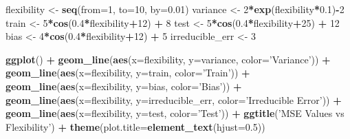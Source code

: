 \documentclass[]{article}
\newenvironment{Shaded}{\begin{snugshade}}{\end{snugshade}}
\newcommand{\DataTypeTok}[1]{\textcolor[rgb]{0.13,0.29,0.53}{#1}}
\newcommand{\DecValTok}[1]{\textcolor[rgb]{0.00,0.00,0.81}{#1}}
\newcommand{\FloatTok}[1]{\textcolor[rgb]{0.00,0.00,0.81}{#1}}
\newcommand{\KeywordTok}[1]{\textcolor[rgb]{0.13,0.29,0.53}{\textbf{#1}}}
\newcommand{\NormalTok}[1]{#1}
\newcommand{\OperatorTok}[1]{\textcolor[rgb]{0.81,0.36,0.00}{\textbf{#1}}}
\newcommand{\StringTok}[1]{\textcolor[rgb]{0.31,0.60,0.02}{#1}}
\begin{document}
\begin{Shaded}
\begin{Highlighting}[]
\NormalTok{flexibility <-}\StringTok{ }\KeywordTok{seq}\NormalTok{(}\DataTypeTok{from=}\DecValTok{1}\NormalTok{, }\DataTypeTok{to=}\DecValTok{10}\NormalTok{, }\DataTypeTok{by=}\FloatTok{0.01}\NormalTok{)}
\NormalTok{variance <-}\StringTok{ }\DecValTok{2}\OperatorTok{*}\KeywordTok{exp}\NormalTok{(flexibility}\OperatorTok{*}\FloatTok{0.1}\NormalTok{)}\OperatorTok{-}\DecValTok{2}
\NormalTok{train <-}\StringTok{ }\DecValTok{5}\OperatorTok{*}\KeywordTok{cos}\NormalTok{(}\FloatTok{0.4}\OperatorTok{*}\NormalTok{flexibility}\OperatorTok{+}\DecValTok{12}\NormalTok{) }\OperatorTok{+}\StringTok{ }\DecValTok{8}
\NormalTok{test <-}\StringTok{ }\DecValTok{5}\OperatorTok{*}\KeywordTok{cos}\NormalTok{(}\FloatTok{0.4}\OperatorTok{*}\NormalTok{flexibility}\OperatorTok{+}\DecValTok{25}\NormalTok{) }\OperatorTok{+}\StringTok{ }\DecValTok{12}
\NormalTok{bias <-}\StringTok{ }\DecValTok{4}\OperatorTok{*}\KeywordTok{cos}\NormalTok{(}\FloatTok{0.4}\OperatorTok{*}\NormalTok{flexibility}\OperatorTok{+}\DecValTok{12}\NormalTok{) }\OperatorTok{+}\StringTok{ }\DecValTok{5}
\NormalTok{irreducible_err <-}\StringTok{ }\DecValTok{3}

\KeywordTok{ggplot}\NormalTok{() }\OperatorTok{+}\StringTok{ }\KeywordTok{geom_line}\NormalTok{(}\KeywordTok{aes}\NormalTok{(}\DataTypeTok{x=}\NormalTok{flexibility, }\DataTypeTok{y=}\NormalTok{variance, }\DataTypeTok{color=}\StringTok{'Variance'}\NormalTok{)) }\OperatorTok{+}\StringTok{ }\KeywordTok{geom_line}\NormalTok{(}\KeywordTok{aes}\NormalTok{(}\DataTypeTok{x=}\NormalTok{flexibility, }\DataTypeTok{y=}\NormalTok{train, }\DataTypeTok{color=}\StringTok{'Train'}\NormalTok{)) }\OperatorTok{+}\StringTok{ }\KeywordTok{geom_line}\NormalTok{(}\KeywordTok{aes}\NormalTok{(}\DataTypeTok{x=}\NormalTok{flexibility, }\DataTypeTok{y=}\NormalTok{bias, }\DataTypeTok{color=}\StringTok{'Bias'}\NormalTok{)) }\OperatorTok{+}\StringTok{ }\KeywordTok{geom_line}\NormalTok{(}\KeywordTok{aes}\NormalTok{(}\DataTypeTok{x=}\NormalTok{flexibility, }\DataTypeTok{y=}\NormalTok{irreducible_err, }\DataTypeTok{color=}\StringTok{'Irreducible Error'}\NormalTok{)) }\OperatorTok{+}\StringTok{ }\KeywordTok{geom_line}\NormalTok{(}\KeywordTok{aes}\NormalTok{(}\DataTypeTok{x=}\NormalTok{flexibility, }\DataTypeTok{y=}\NormalTok{test, }\DataTypeTok{color=}\StringTok{'Test'}\NormalTok{)) }\OperatorTok{+}\StringTok{ }\KeywordTok{ggtitle}\NormalTok{(}\StringTok{'MSE Values vs Flexibility'}\NormalTok{) }\OperatorTok{+}\StringTok{ }\KeywordTok{theme}\NormalTok{(}\DataTypeTok{plot.title=}\KeywordTok{element_text}\NormalTok{(}\DataTypeTok{hjust=}\FloatTok{0.5}\NormalTok{))}
\end{Highlighting}
\end{Shaded}
\end{document}
